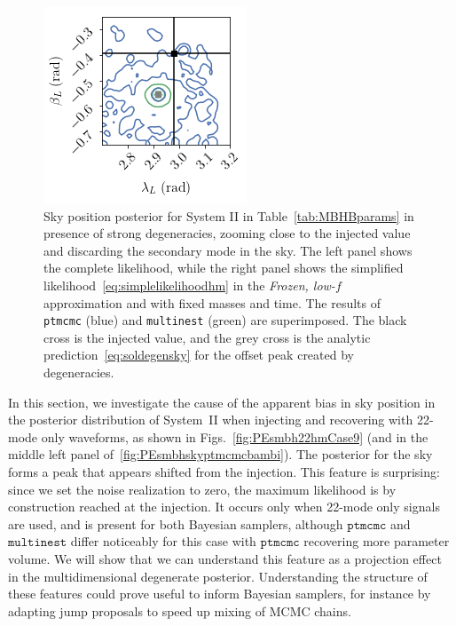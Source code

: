 \documentclass[aps,showpacs,twocolumn,prd,superscriptaddress,nofootinbib]{revtex4-1}
\begin{document}
\begin{figure}
\begin{minipage}{.49\linewidth}
  \includegraphics[width=.99\linewidth]{corner_skydown_smbh_case9_simplelike_ptmcmc_bambi_withdegen.png}
  \end{minipage}
  \caption{Sky position posterior for System II in Table~\ref{tab:MBHBparams} in presence of strong degeneracies, zooming close to the injected value and discarding the secondary mode in the sky. The left panel shows the complete likelihood, while the right panel shows the simplified likelihood~\eqref{eq:simplelikelihoodhm} in the \textit{Frozen, low-$f$} approximation and with fixed masses and time. The results of \texttt{ptmcmc} (blue) and \texttt{multinest} (green) are superimposed. The black cross is the injected value, and the grey cross is the analytic prediction~\eqref{eq:soldegensky} for the offset peak created by degeneracies.}
  \label{fig:Skydownsmbh22hmSimpleLikeCase9}
\end{figure}

In this section, we investigate the cause of the apparent bias in sky position in the posterior distribution of System~II when injecting and recovering with 22-mode only waveforms, as shown in Figs.~\ref{fig:PEsmbh22hmCase9} (and in the middle left panel of~\ref{fig:PEsmbhskyptmcmcbambi}). The posterior for the sky forms a peak that appears shifted from the injection. This feature is surprising: since we set the noise realization to zero, the maximum likelihood is by construction reached at the injection. It occurs only when 22-mode only signals are used, and is present for both Bayesian samplers, although $\texttt{ptmcmc}$ and $\texttt{multinest}$ differ noticeably for this case with $\texttt{ptmcmc}$ recovering more parameter volume. We will show that we can understand this feature as a projection effect in the multidimensional degenerate posterior. Understanding the structure of these features could prove useful to inform Bayesian samplers, for instance by adapting jump proposals to speed up mixing of MCMC chains.
\end{document}
